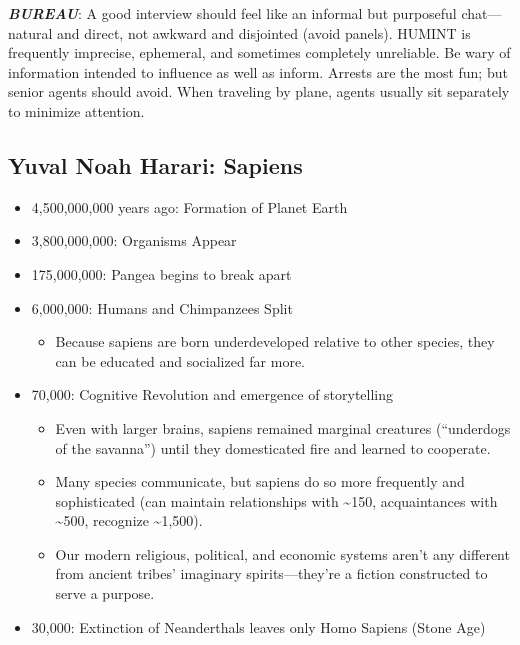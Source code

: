 \documentclass[
]{article}
\providecommand{\tightlist}{%
  \setlength{\itemsep}{0pt}\setlength{\parskip}{0pt}}
\begin{document}
\textbf{\emph{BUREAU}}: A good interview should feel like an informal
but purposeful chat---natural and direct, not awkward and disjointed
(avoid panels). HUMINT is frequently imprecise, ephemeral, and sometimes
completely unreliable. Be wary of information intended to influence as
well as inform. Arrests are the most fun; but senior agents should
avoid. When traveling by plane, agents usually sit separately to
minimize attention.

\hypertarget{yuval-noah-harari-sapiens}{%
\subsection{Yuval Noah Harari:
Sapiens}\label{yuval-noah-harari-sapiens}}

\begin{itemize}
\item
  4,500,000,000 years ago: Formation of Planet Earth
\item
  3,800,000,000: Organisms Appear
\item
  175,000,000: Pangea begins to break apart
\item
  6,000,000: Humans and Chimpanzees Split

  \begin{itemize}
  \tightlist
  \item
    Because sapiens are born underdeveloped relative to other species,
    they can be educated and socialized far more.
  \end{itemize}
\item
  70,000: Cognitive Revolution and emergence of storytelling

  \begin{itemize}
  \item
    Even with larger brains, sapiens remained marginal creatures
    (``underdogs of the savanna'') until they domesticated fire and
    learned to cooperate.
  \item
    Many species communicate, but sapiens do so more frequently and
    sophisticated (can maintain relationships with \textasciitilde150,
    acquaintances with \textasciitilde500, recognize
    \textasciitilde1,500).
  \item
    Our modern religious, political, and economic systems aren't any
    different from ancient tribes' imaginary spirits---they're a fiction
    constructed to serve a purpose.
  \end{itemize}
\item
  30,000: Extinction of Neanderthals leaves only Homo Sapiens (Stone
  Age)


\end{itemize}
\end{document}
